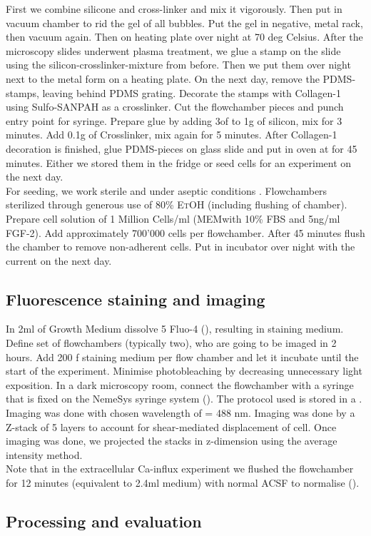 First we combine silicone  and cross-linker  and mix it vigorously. Then put in vacuum chamber to rid the gel of all bubbles. Put the gel in negative, metal rack, then vacuum again. Then on heating plate over night at 70 deg Celsius. After the microscopy slides underwent plasma treatment, we glue a stamp on the slide using the silicon-crosslinker-mixture from before. Then we put them over night next to the metal form on a heating plate. On the next day, remove the PDMS-stamps, leaving behind PDMS grating. Decorate the stamps with Collagen-1  using Sulfo-SANPAH as a crosslinker. Cut the flowchamber pieces and punch entry point for syringe. Prepare glue by adding 3\mul of  to 1g of silicon, mix for 3 minutes. Add 0.1g of Crosslinker, mix again for 5 minutes. After Collagen-1 decoration is finished, glue PDMS-pieces on glass slide and put in oven at  for 45 minutes. Either we stored them in the fridge or seed cells for an experiment on the next day.\\
For seeding, we work sterile and under aseptic conditions . Flowchambers sterilized through generous use of 80\% \textsc{EtOH} (including flushing of chamber). Prepare cell solution of 1 Million Cells/ml (MEM\textalpha{ }with 10\% FBS and 5ng/ml FGF-2). Add approximately 700'000 cells per flowchamber. After 45 minutes flush the chamber to remove non-adherent cells. Put in incubator over night with the current  on the next day.


\subsection{Fluorescence staining and imaging}
In 2ml of Growth Medium dissolve 5\mul{} Fluo-4 (), resulting in staining medium. Define set of flowchambers (typically two), who are going to be imaged in 2 hours. Add 200\mul{} f staining medium per flow chamber and let it incubate until the start of the experiment. Minimise photobleaching by decreasing unnecessary light exposition. In a dark microscopy room, connect the flowchamber with a syringe that is fixed on the NemeSys syringe system (). The protocol used is stored in a \myworries{}. Imaging was done with chosen wavelength of \textlambda = 488 nm. Imaging was done by a Z-stack of 5 layers to account for shear-mediated displacement of cell. Once imaging was done, we projected the stacks in z-dimension using the average intensity method.  \\
Note that in the extracellular Ca-influx experiment we flushed the flowchamber for 12 minutes (equivalent to 2.4ml medium) with normal ACSF to normalise ().




\subsection{Processing and evaluation}

